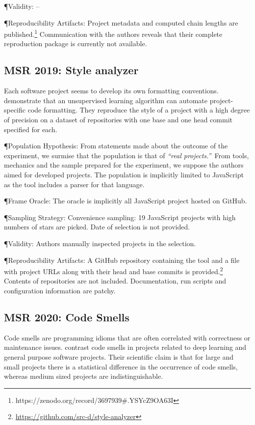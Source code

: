 \documentclass[sigconf,review,anonymous]{acmart}
\newcommand{\gh}{{GitHub}\xspace}
\begin{document}
\P{Validity:} --

\P{Reproducibility Artifacts:} Project metadata and computed chain len\-gths are
published.\footnote{https://zenodo.org/record/3697939\#.YSYcZ9OA63I}
Communication with the authors reveals that their complete reproduction package
is currently not available.

\subsection{MSR 2019: Style analyzer}

Each software project seems to develop its own formatting conventions.
\citet{Markovtsev:2019:MSR} demonstrate that an unsupervised learning algorithm
can automate project-specific code formatting. They reproduce the style of a
project with a high degree of precision on a dataset of repositories with one
base and one head commit specified for each.

\P{Population Hypothesis:} From statements made about the outcome of the
experiment, we surmise that the population is that of {\it ``real projects.''\,}
From tools, mechanics and the sample prepared for the experiment, we suppose the
authors aimed for developed projects. The population is implicitly limited to
JavaScript as the tool includes a parser for that language.

\P{Frame Oracle:} The oracle is implicitly all JavaScript project hosted on \gh.

\P{Sampling Strategy:} Convenience sampling: 19 JavaScript projects with high
numbers of stars are picked. Date of selection is not provided.

\P{Validity:} Authors manually inspected projects in the selection.

\P{Reproducibility Artifacts:} A \gh repository containing the tool and a file
with project URLs along with their head and base commits is
provided.\footnote{\url{https://github.com/src-d/style-analyzer}} Contents of
repositories are not included. Documentation, run scripts and configuration
information are patchy.

\subsection{MSR 2020: Code Smells}

Code smells are programming idioms that are often correlated with correctness or
maintenance issues. \citet{Jebnoun:2020:MSR} contrast code smells in projects
related to deep learning and general purpose software projects. Their scientific
claim is that for large and small projects there is a statistical difference in
the occurrence of code smells, whereas medium sized projects are
indistinguishable.
\end{document}
